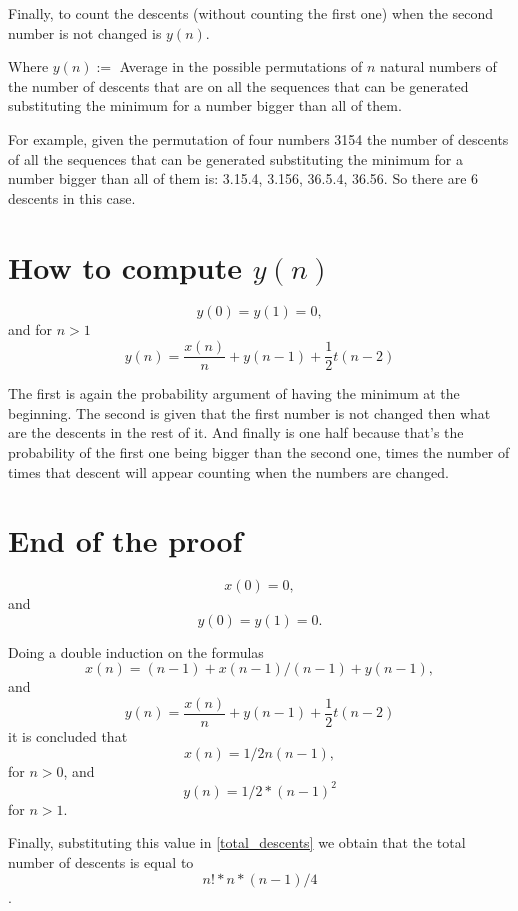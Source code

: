 \documentclass{article}
\begin{document}
Finally, to count the descents (without counting the first one) when the second number is not changed is $y(n)$.


Where $y(n):=$ Average in the possible permutations of $n$ natural numbers of the number of descents that are on all the sequences that can be generated substituting the minimum for a number bigger than all of them.

For example, given the permutation of four numbers 3154 the number of descents of all the sequences that can be generated substituting the minimum for a number bigger than all of them is: 3.15.4, 3.156, 36.5.4, 36.56. So there are 6 descents in this case.

\section{How to compute $y(n)$}

$$y(0) = y(1) = 0,$$
and for $n>1$
$$y(n) = \frac{x(n)}{n} + y(n-1) + \frac{1}{2} t(n-2)$$

The first is again the probability argument of having the minimum at the beginning. The second is given that the first number is not changed then what are the descents in the rest of it. And finally is one half because that's the probability of the first one being bigger than the second one, times the number of times that descent will appear counting when the numbers are changed.

\section{End of the proof}

$$x(0) = 0,$$
and
$$y(0) = y(1) = 0.$$

Doing a double induction on the formulas 
$$x(n)= (n-1) + x(n-1)/(n-1) + y(n-1),$$
and
$$y(n) = \frac{x(n)}{n} + y(n-1) + \frac{1}{2} t(n-2)$$
it is concluded that 
$$x(n)= 1/2n(n - 1),$$
for $n>0$, and
$$y(n)= 1/2*(n - 1)^2$$
for $n>1$.

Finally, substituting this value in \eqref{total_descents} we obtain that the total number of descents is equal to $$n!*n*(n-1)/4$$.
        
\end{document}
